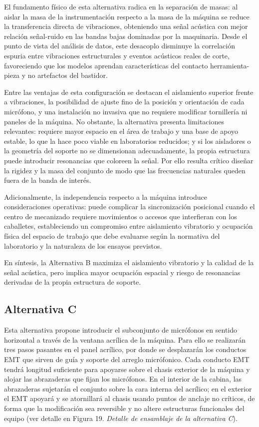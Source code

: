 \documentclass[12pt, letterpaper]{report}
\begin{document}
El fundamento físico de esta alternativa radica en la separación de masas: al aislar la masa de la instrumentación respecto a la masa de la máquina se reduce la transferencia directa de vibraciones, obteniendo una señal acústica con mejor relación señal-ruido en las bandas bajas dominadas por la maquinaria. Desde el punto de vista del análisis de datos, este desacoplo disminuye la correlación espuria entre vibraciones estructurales y eventos acústicos reales de corte, favoreciendo que los modelos aprendan características del contacto herramienta-pieza y no artefactos del bastidor.

Entre las ventajas de esta configuración se destacan el aislamiento superior frente a vibraciones, la posibilidad de ajuste fino de la posición y orientación de cada micrófono, y una instalación no invasiva que no requiere modificar tornillería ni paneles de la máquina. No obstante, la alternativa presenta limitaciones relevantes: requiere mayor espacio en el área de trabajo y una base de apoyo estable, lo que la hace poco viable en laboratorios reducidos; y si los aisladores o la geometría del soporte no se dimensionan adecuadamente, la propia estructura puede introducir resonancias que coloreen la señal. Por ello resulta crítico diseñar la rigidez y la masa del conjunto de modo que las frecuencias naturales queden fuera de la banda de interés.

Adicionalmente, la independencia respecto a la máquina introduce consideraciones operativas: puede complicar la sincronización posicional cuando el centro de mecanizado requiere movimientos o accesos que interfieran con los caballetes, estableciendo un compromiso entre aislamiento vibratorio y ocupación física del espacio de trabajo que debe evaluarse según la normativa del laboratorio y la naturaleza de los ensayos previstos.

En síntesis, la Alternativa B maximiza el aislamiento vibratorio y la calidad de la señal acústica, pero implica mayor ocupación espacial y riesgo de resonancias derivadas de la propia estructura de soporte.

\subsection{Alternativa C}

Esta alternativa propone introducir el subconjunto de micrófonos en sentido horizontal a través de la ventana acrílica de la máquina. Para ello se realizarán tres pasos pasantes en el panel acrílico, por donde se desplazarán los conductos EMT que sirven de guía y soporte del arreglo micrófonico. Cada conducto EMT tendrá longitud suficiente para apoyarse sobre el chasis exterior de la máquina y alojar las abrazaderas que fijan los micrófonos. En el interior de la cabina, las abrazaderas sujetarán el conjunto sobre la cara interna del acrílico; en el exterior el EMT apoyará y se atornillará al chasis usando puntos de anclaje no críticos, de forma que la modificación sea reversible y no altere estructuras funcionales del equipo (ver detalle en Figura 19. \textit{Detalle de ensamblaje de la alternativa C}).
\end{document}

